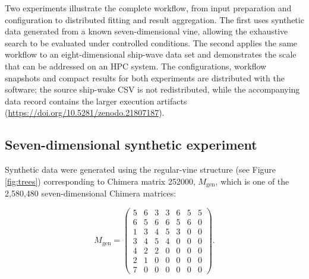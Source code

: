 \documentclass[preprint,12pt, a4paper]{elsarticle}
\begin{document}
Two experiments illustrate the complete workflow, from input preparation and
configuration to distributed fitting and result aggregation. The first uses
synthetic data generated from a known seven-dimensional vine, allowing the exhaustive
search to be evaluated under controlled conditions. The second applies the
same workflow to an eight-dimensional ship-wave data set and demonstrates the
scale that can be addressed on an HPC system. The configurations, workflow
snapshots and compact results for both experiments are distributed with the
software; the source ship-wake CSV is not
redistributed, while the accompanying data record contains the larger execution
artifacts (\url{https://doi.org/10.5281/zenodo.21807187}).

\subsection{Seven-dimensional synthetic experiment}

Synthetic data were generated using the regular-vine structure (see Figure \ref{fig:trees}) corresponding to Chimera matrix 252000, $M_{\mathrm{gen}}$, which is one of the 2,580,480 seven-dimensional Chimera matrices:

\[
M_{\mathrm{gen}}=
\begin{pmatrix}
5 & 6 & 3 & 3 & 6 & 5 & 5 \\
6 & 5 & 6 & 6 & 5 & 6 & 0 \\
1 & 3 & 4 & 5 & 3 & 0 & 0 \\
3 & 4 & 5 & 4 & 0 & 0 & 0 \\
4 & 2 & 2 & 0 & 0 & 0 & 0 \\
2 & 1 & 0 & 0 & 0 & 0 & 0 \\
7 & 0 & 0 & 0 & 0 & 0 & 0
\end{pmatrix}.
\]
\end{document}
